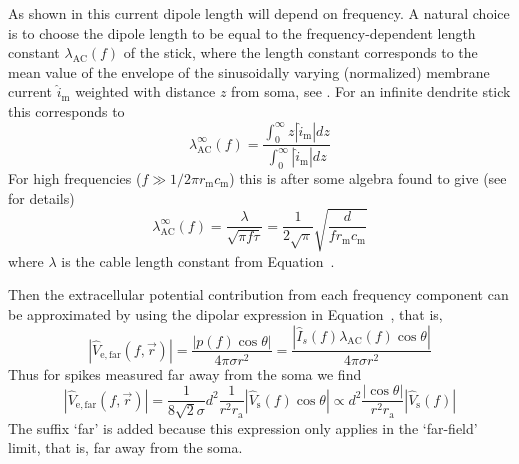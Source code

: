 As shown in  this current dipole length will depend on frequency.
A natural choice is to choose the dipole length to be equal to the frequency-dependent length constant $\lambda_\mathrm{AC}(f)$ of the stick,
where the length constant corresponds to the mean value of the 
envelope of the sinusoidally varying (normalized) membrane current
$\hat{i}_\mathrm{m}$ weighted with distance $z$ from soma, see . 
For an infinite dendrite stick this corresponds to
%
\begin{equation}
  \lambda_\mathrm{AC}^\infty(f) = \frac{\int_0^\infty z |\hat{i}_\mathrm{m}| dz}{\int_0^\infty |\hat{i}_\mathrm{m}| dz} 
  \label{eq:Spikes:formula_lambda_ac}
\end{equation}
%
For high frequencies ($f \gg 1/2 \pi r_\mathrm{m} c_\mathrm{m}$) this is after some algebra 
found to give (see  for details)
%
\begin{equation}
 \lambda_\mathrm{AC}^\infty(f) =  \frac{\lambda}{\sqrt{\pi f \tau}} = 
  \frac{1}{2\sqrt{\pi}} \sqrt{\frac{d}{f r_\mathrm{m} c_\mathrm{m}}}
\label{eq:Spikes:approx_lambda_ac}
\end{equation}
%
where $\lambda$ is the cable length constant from Equation~.


Then the extracellular potential contribution from each frequency component can be approximated by using the 
dipolar expression in Equation~, that is,
\begin{equation}
  |\hat{V}_\mathrm{e,far}(f,\vec{r})| =  \frac{|p(f) \cos \theta|}{4 \pi \sigma r^2} 
                                            = \frac{| \hat{I}_{s}(f) \lambda_\mathrm{AC}(f) \cos \theta|}{4 \pi \sigma r^2}   
                                                                                        \label{eq:Spikes:Ve_far_1}
\end{equation}
Thus for spikes measured far away from the soma we find 
%  
\begin{equation}
  |\hat{V}_\mathrm{e,far}(f,\vec{r})|  = \frac{1}{8 \sqrt{2} \sigma} d^{2} \frac{1}{r^2  r_\mathrm{a}} 
      |\hat{V}_\mathrm{s}(f) \cos \theta | 
  \propto d^{2} \frac{|\cos \theta|}{r^2  r_\mathrm{a}} |\hat{V}_\mathrm{s}(f)| 
  \label{eq:Spikes:Ve_far_2}
\end{equation}
The suffix `far' is added because this expression only applies in the `far-field' limit, that is,
far away from the soma. 
%


